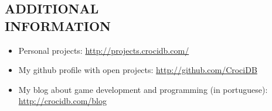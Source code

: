 \documentclass[line,margin]{res}
\begin{document}
\begin{resume}
\section{ADDITIONAL \\ INFORMATION}
            \begin{itemize}  \itemsep -3pt
            \item Personal projects: \href{http://projects.crocidb.com/}{http://projects.crocidb.com/}
            \item My github profile with open projects: \href{http://github.com/CrociDB}{http://github.com/CrociDB}
            \item My blog about game development and programming (in portuguese): \href{http://crocidb.com/blog}{http://crocidb.com/blog}
            \end{itemize} 
 

\end{resume}
\end{document}
